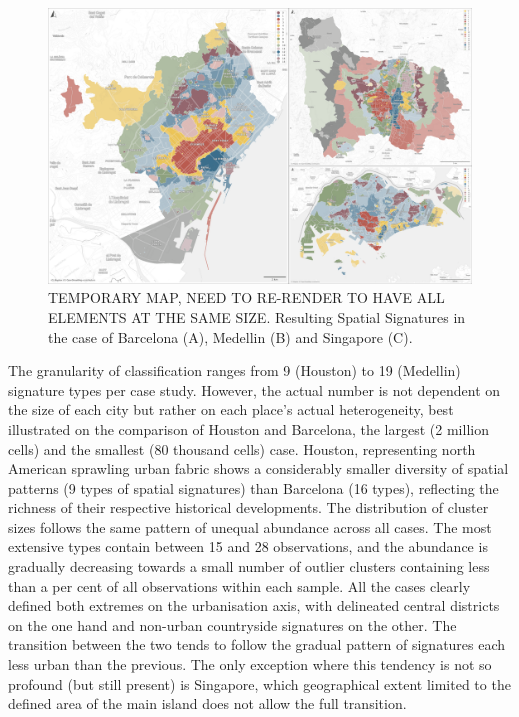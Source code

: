 \begin{figure}
    \includegraphics[width=\linewidth]{figures/maps1.png}
    \caption{TEMPORARY MAP, NEED TO RE-RENDER TO HAVE ALL ELEMENTS AT THE SAME SIZE.
    Resulting Spatial Signatures in the case of Barcelona (A), Medellin (B) and Singapore (C).}
    \label{fig:maps1}
\end{figure}

The granularity of classification ranges from 9 (Houston) to 19 (Medellin) signature
types per case study. However, the actual number is not dependent on the size of each
city but rather on each place's actual heterogeneity, best illustrated on the comparison
of Houston and Barcelona, the largest (2 million cells) and the smallest (80 thousand
cells) case. Houston, representing north American sprawling urban fabric shows a
considerably smaller diversity of spatial patterns (9 types of spatial signatures) than
Barcelona (16 types), reflecting the richness of their respective historical
developments.
The distribution of cluster sizes follows the same pattern of unequal abundance across
all cases. The most extensive types contain between 15 and 28%
observations, and the abundance is gradually decreasing towards a small number of
outlier clusters containing less than a per cent of all observations within each sample.
All the cases clearly defined both extremes on the urbanisation axis, with delineated
central districts on the one hand and non-urban countryside signatures on the other. The
transition between the two tends to follow the gradual pattern of signatures each less
urban than the previous. The only exception where this tendency is not so profound (but
still present) is Singapore, which geographical extent limited to the defined area of
the main island does not allow the full transition.

